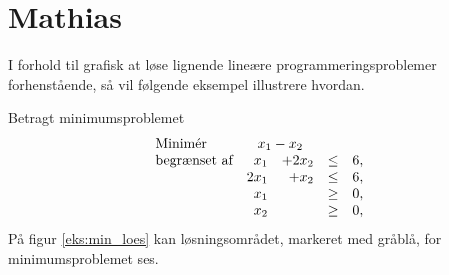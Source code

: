 \section{Mathias}

I forhold til grafisk at løse lignende lineære programmeringsproblemer forhenstående, så vil følgende eksempel illustrere hvordan. 

\begin{eks}
\label{eks:min_loes}
Betragt minimumsproblemet
%
\begin{align*}
\begin{array}{lrrlr}
\text{Minimér}		&	\multicolumn{2}{c}{x_1-x_2}  &\\
\text{begrænset af}	&x_1& + 2x_2			&\leq 	& 6,\\
					&2x_1& + x_2			&\leq	& 6,\\
					&x_1&    				&\geq	& 0,\\
					&x_2&    				&\geq	& 0,\\
\end{array}
\end{align*}
%
På figur \ref{eks:min_loes} kan løsningsområdet, markeret med gråblå, for minimumsproblemet ses.
%

\end{eks}